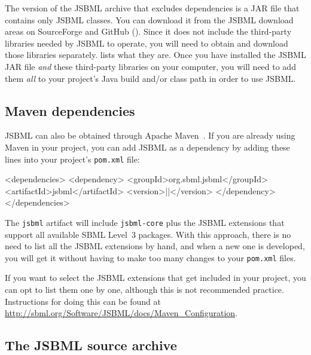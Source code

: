 The version of the JSBML archive that excludes dependencies is a JAR file
that contains only JSBML classes. You can download it from the JSBML download areas
on SourceForge and GitHub (\cite{JSBMLdownloadSF,JSBMLdownloadGitHub}). Since it does not include the
third-party libraries needed by JSBML to operate, you will need to obtain
and download those libraries separately.  lists
what they are. Once you have installed the JSBML JAR file \emph{and} these
third-party libraries on your computer, you will need to add them
\emph{all} to your project's Java build and/or class path in order to use JSBML.


\subsection{Maven dependencies}

JSBML can also be obtained through Apache Maven~\citep{ApacheMaven}.
If you are already using Maven in your project, you can add JSBML
as a dependency by adding these lines into your project's \texttt{pom.xml} file:

\begin{example}[style=XML,
keywords={repositories,repository,id,name,url,releases,enabled,dependencies,
    dependency,groupId,artifactId,version},
  title={Maven instructions to add to your pom.xml.}]
<dependencies>
  <dependency>
    <groupId>org.sbml.jsbml</groupId>
    <artifactId>jsbml</artifactId>
    <version>|\jsbmlversion|</version>
  </dependency>
</dependencies> 
\end{example}

The \texttt{jsbml} artifact will include \texttt{jsbml-core} plus the JSBML
extensions that support all available SBML Level~3 packages.  With this
approach, there is no need to list all the JSBML extensions by hand, and when
a new one is developed, you will get it without having to make too many
changes to your \texttt{pom.xml} files.

If you want to select the JSBML extensions that get included in your
project, you can opt to list them one by one, although this is not recommended practice.  Instructions for doing this can be
found at \url{http://sbml.org/Software/JSBML/docs/Maven_Configuration}.


\subsection{The JSBML source archive}
\label{sec:jsbml-source-archive}

